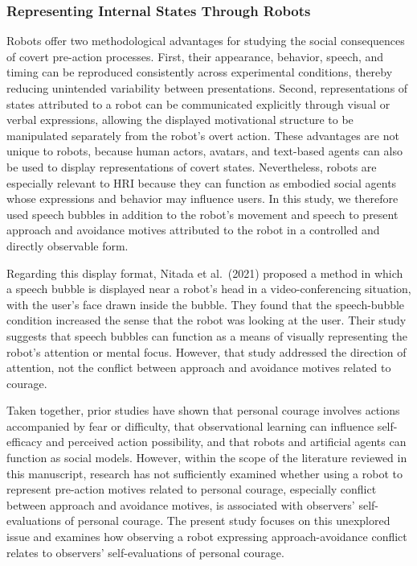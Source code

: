 \documentclass[
]{article}
\begin{document}
\subsubsection{Representing Internal States Through
Robots}\label{representing-internal-states-through-robots}

Robots offer two methodological advantages for studying the social
consequences of covert pre-action processes. First, their appearance,
behavior, speech, and timing can be reproduced consistently across
experimental conditions, thereby reducing unintended variability between
presentations. Second, representations of states attributed to a robot
can be communicated explicitly through visual or verbal expressions,
allowing the displayed motivational structure to be manipulated
separately from the robot's overt action. These advantages are not
unique to robots, because human actors, avatars, and text-based agents
can also be used to display representations of covert states.
Nevertheless, robots are especially relevant to HRI because they can
function as embodied social agents whose expressions and behavior may
influence users. In this study, we therefore used speech bubbles in
addition to the robot's movement and speech to present approach and
avoidance motives attributed to the robot in a controlled and directly
observable form.

Regarding this display format, Nitada et al.~(2021) proposed a method in
which a speech bubble is displayed near a robot's head in a
video-conferencing situation, with the user's face drawn inside the
bubble. They found that the speech-bubble condition increased the sense
that the robot was looking at the user. Their study suggests that speech
bubbles can function as a means of visually representing the robot's
attention or mental focus. However, that study addressed the direction
of attention, not the conflict between approach and avoidance motives
related to courage.

Taken together, prior studies have shown that personal courage involves
actions accompanied by fear or difficulty, that observational learning
can influence self-efficacy and perceived action possibility, and that
robots and artificial agents can function as social models. However,
within the scope of the literature reviewed in this manuscript, research
has not sufficiently examined whether using a robot to represent
pre-action motives related to personal courage, especially conflict
between approach and avoidance motives, is associated with observers'
self-evaluations of personal courage. The present study focuses on this
unexplored issue and examines how observing a robot expressing
approach-avoidance conflict relates to observers' self-evaluations of
personal courage.
\end{document}
